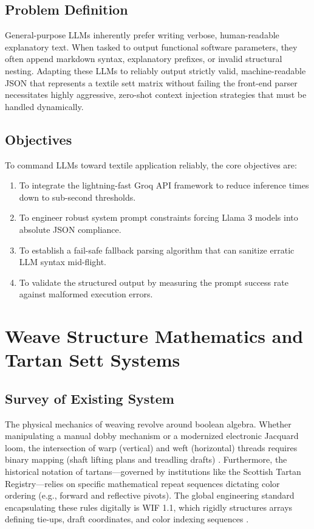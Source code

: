 \subsection{Problem Definition}
General-purpose LLMs inherently prefer writing verbose, human-readable explanatory text. When tasked to output functional software parameters, they often append markdown syntax, explanatory prefixes, or invalid structural nesting. Adapting these LLMs to reliably output strictly valid, machine-readable JSON that represents a textile sett matrix without failing the front-end parser necessitates highly aggressive, zero-shot context injection strategies that must be handled dynamically.

\subsection{Objectives}
To command LLMs toward textile application reliably, the core objectives are:
\begin{enumerate}
    \item To integrate the lightning-fast Groq API framework to reduce inference times down to sub-second thresholds.
    \item To engineer robust system prompt constraints forcing Llama 3 models into absolute JSON compliance.
    \item To establish a fail-safe fallback parsing algorithm that can sanitize erratic LLM syntax mid-flight.
    \item To validate the structured output by measuring the prompt success rate against malformed execution errors.
\end{enumerate}

\section{Weave Structure Mathematics and Tartan Sett Systems}

\subsection{Survey of Existing System}
The physical mechanics of weaving revolve around boolean algebra. Whether manipulating a manual dobby mechanism or a modernized electronic Jacquard loom, the intersection of warp (vertical) and weft (horizontal) threads requires binary mapping (shaft lifting plans and treadling drafts) \cite{ref8}. Furthermore, the historical notation of tartans—governed by institutions like the Scottish Tartan Registry—relies on specific mathematical repeat sequences dictating color ordering (e.g., forward and reflective pivots). The global engineering standard encapsulating these rules digitally is WIF 1.1, which rigidly structures arrays defining tie-ups, draft coordinates, and color indexing sequences \cite{ref9}. 

